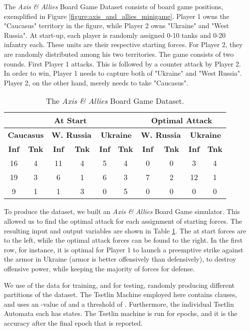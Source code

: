 \documentclass[11pt,a4paper]{article}
\begin{document}
The \emph{Axis \& Allies} Board Game Dataset consists of  board game positions, exemplified in Figure \ref{figure:axis_and_allies_minigame}. Player 1 owns the "Caucasus" territory in the figure, while Player 2 owns "Ukraine" and "West Russia". At start-up, each player is randomly assigned 0-10 tanks and 0-20 infantry each. These units are their respective starting forces. For Player 2, they are randomly distributed among his two territories. The game consists of two rounds. First Player 1 attacks. This is followed by a counter attack by Player 2. In order to win, Player 1 needs to capture both of "Ukraine" and "West Russia". Player 2, on the other hand, merely needs to take "Caucasus".

\begin{table}[!bh]
    \centering
    \begin{tabular}{c|c|c|c|c|c||c|c|c|c}
    \multicolumn{6}{c||}{\bf At Start}&\multicolumn{4}{c}{\bf Optimal Attack}\\
    \hline
    \multicolumn{2}{c|}{\bf Caucasus}&\multicolumn{2}{c|}{\bf W. Russia}&\multicolumn{2}{c||}{\bf Ukraine}&\multicolumn{2}{c|}{\bf W. Russia}&\multicolumn{2}{c}{\bf Ukraine}\\
     \hline
    \bf Inf&\bf Tnk&\bf Inf&\bf Tnk&\bf Inf&\bf Tnk&\bf Inf&\bf Tnk&\bf Inf&\bf Tnk\\
    \hline
    \hline
    16&4&11&4&5&4&0&0&3&4\\
    19&3&6&1&6&3&7&2&12&1\\
    9&1&1&3&0&5&0&0&0&0
    \end{tabular}
    \caption{The \emph{Axis \& Allies} Board Game Dataset.}
    \label{table:aa_dataset}
\end{table}

To produce the dataset, we built an \emph{Axis \& Allies} Board Game  simulator. This allowed us to find the optimal attack for each assignment of starting forces. The resulting input and output variables are shown in Table \ref{table:aa_dataset}. The at start forces are to the left, while the optimal attack forces can be found to the right. In the first row, for instance, it is optimal for Player 1 to launch a preemptive strike against the armor in Ukraine (armor is better offensively than defensively), to destroy offensive power, while keeping the majority of forces for defense.

We use  of the data for training, and  for testing, randomly producing  different partitions of the dataset. The Tsetlin Machine employed here contains  clauses, and uses an -value of  and a threshold  of . Furthermore, the individual Tsetlin Automata each has  states. The Tsetlin machine is run for  epochs, and it is the accuracy after the final epoch that is reported.
\end{document}
